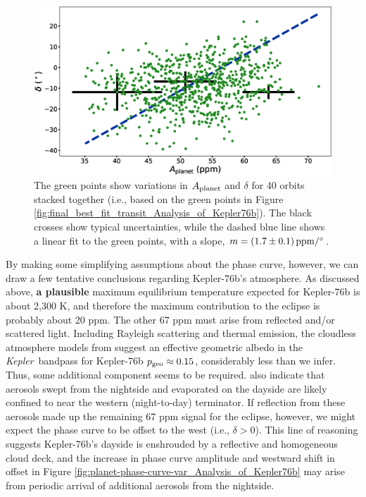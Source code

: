 \documentclass[manuscript]{aastex62}
\newcommand{\kepler}{{\it Kepler}}
\begin{document}
\begin{figure}
\includegraphics[width=\textwidth]{f9.eps}
\caption{The green points show variations in $A_{\rm planet}$ and $\delta$ for 40 orbits stacked together (i.e., based on the green points in Figure \ref{fig:final_best_fit_transit_Analysis_of_Kepler76b}). The black crosses show typical uncertainties, while the dashed blue line shows a linear fit to the green points, with a slope, $m = \left( 1.7 \pm 0.1 \right) {\rm ppm/^\circ}$. \label{fig:Aplanet-delta-var_Analysis_of_Kepler76b}}
\end{figure}

By making some simplifying assumptions about the phase curve, however, we can draw a few tentative conclusions regarding Kepler-76b's atmosphere. As discussed above, \textbf{a plausible} maximum equilibrium temperature expected for Kepler-76b is about 2,300 K, and therefore the maximum contribution to the eclipse is probably about 20 ppm. The other 67 ppm must arise from reflected and/or scattered light. Including Rayleigh scattering and thermal emission, the cloudless atmosphere models from \citet{2016ApJ...828...22P} suggest an effective geometric albedo in the \kepler\ bandpass for Kepler-76b $p_{\rm geo} \approx 0.15$, considerably less than we infer. Thus, some additional component seems to be required. \citet{2016ApJ...828...22P} also indicate that aerosols swept from the nightside and evaporated on the dayside are likely confined to near the western (night-to-day) terminator. If reflection from these aerosols made up the remaining 67 ppm signal for the eclipse, however, we might expect the phase curve to be offset to the west (i.e., $\delta > 0$). This line of reasoning suggests Kepler-76b's dayside is enshrouded by a reflective and homogeneous cloud deck, and the increase in phase curve amplitude and westward shift in offset in Figure \ref{fig:planet-phase-curve-var_Analysis_of_Kepler76b} may arise from periodic arrival of additional aerosols from the nightside.
\end{document}
